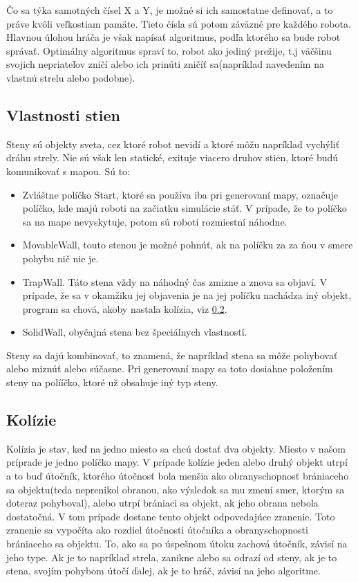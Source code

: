 Čo sa týka samotných čísel X a Y, je možné si ich samostatne definovať, a to práve kvôli veľkostiam pamäte. Tieto čísla sú potom záväzné pre každého robota.
\\Hlavnou úlohou hráča je však napísať algoritmus, podľa ktorého sa bude robot správať. Optimálny algoritmus spraví to, robot ako jediný prežije, t.j väčšinu svojich nepriateľov zničí alebo ich prinúti zničíť sa(napríklad navedením na vlastnú strelu alebo podobne).

\subsection{Vlastnosti stien}\label{walls} %
Steny sú objekty sveta, cez ktoré robot nevidí a ktoré môžu napríklad vychýliť dráhu strely. Nie sú však len statické, exituje viacero druhov stien, ktoré budú komunikovať s mapou. Sú to:\\
\begin{itemize}
\item Zvláštne políčko Start, ktoré sa používa iba pri generovaní mapy, označuje políčko, kde majú roboti na začiatku simulácie stáť. V prípade, že to políčko sa na mape nevyskytuje, potom sú roboti rozmiestní náhodne.
\item MovableWall, touto stenou je možné pohnúť, ak na políčku za za ňou v smere pohybu nič nie je.
\item TrapWall. Táto stena vždy na náhodný čas zmizne a znova sa objaví. V prípade, že sa v okamžiku jej objavenia je na jej políčku nachádza iný objekt, program sa chová, akoby nastala kolízia, viz \ref{kolizie}.
\item SolidWall, obyčajná stena bez špeciálnych vlastností.
\end {itemize}
Steny sa dajú kombinovať, to znamená, že napríklad stena sa môže pohybovať alebo miznúť alebo súčasne. Pri generovaní mapy sa toto dosiahne položením steny na polííčko, ktoré už obsahuje iný typ steny.

\subsection{Kolízie}\label{kolizie}
Kolízia je stav, keď na jedno miesto sa chcú dostať dva objekty. Miesto v našom príprade je jedno políčko mapy. V prípade kolízie jeden alebo druhý objekt utrpí a to buď útočník, ktorého útočnosť bola menšia ako obranyschopnosť brániaceho sa objektu(teda neprenikol obranou, ako výsledok sa mu zmení smer, ktorým sa doteraz pohyboval), alebo utrpí brániaci sa objekt, ak jeho obrana nebola dostatočná. V tom prípade dostane tento objekt odpovedajúce zranenie. Toto zranenie sa vypočíta ako rozdiel útočnosti útočníka a obranyschopnosti brániaceho sa objektu. To, ako sa po úspešnom útoku zachová útočník, závisí na jeho type. Ak je to napríklad strela, zanikne alebo sa odrazí od steny, ak je to stena, svojím pohybom útočí ďalej, ak je to hráč, závisí na jeho algoritme.
